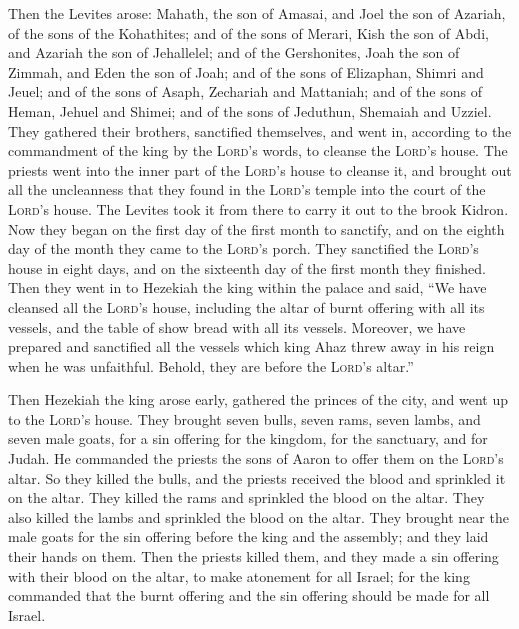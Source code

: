  Then the Levites arose: Mahath, the son of Amasai, and
Joel the son of Azariah, of the sons of the Kohathites; and of the sons
of Merari, Kish the son of Abdi, and Azariah the son of Jehallelel; and
of the Gershonites, Joah the son of Zimmah, and Eden the son of Joah;
 and of the sons of Elizaphan, Shimri and Jeuel; and of
the sons of Asaph, Zechariah and Mattaniah;  and of the
sons of Heman, Jehuel and Shimei; and of the sons of Jeduthun, Shemaiah
and Uzziel.  They gathered their brothers, sanctified
themselves, and went in, according to the commandment of the king by the
\textsc{Lord}'s words, to cleanse the \textsc{Lord}'s house.
 The priests went into the inner part of the
\textsc{Lord}'s house to cleanse it, and brought out all the uncleanness
that they found in the \textsc{Lord}'s temple into the court of the
\textsc{Lord}'s house. The Levites took it from there to carry it out to
the brook Kidron.  Now they began on the first day of the
first month to sanctify, and on the eighth day of the month they came to
the \textsc{Lord}'s porch. They sanctified the \textsc{Lord}'s house in
eight days, and on the sixteenth day of the first month they finished.
 Then they went in to Hezekiah the king within the palace
and said, ``We have cleansed all the \textsc{Lord}'s house, including
the altar of burnt offering with all its vessels, and the table of show
bread with all its vessels.  Moreover, we have prepared
and sanctified all the vessels which king Ahaz threw away in his reign
when he was unfaithful. Behold, they are before the \textsc{Lord}'s
altar.''

 Then Hezekiah the king arose early, gathered the princes
of the city, and went up to the \textsc{Lord}'s house. 
They brought seven bulls, seven rams, seven lambs, and seven male goats,
for a sin offering for the kingdom, for the sanctuary, and for Judah. He
commanded the priests the sons of Aaron to offer them on the
\textsc{Lord}'s altar.  So they killed the bulls, and the
priests received the blood and sprinkled it on the altar. They killed
the rams and sprinkled the blood on the altar. They also killed the
lambs and sprinkled the blood on the altar.  They brought
near the male goats for the sin offering before the king and the
assembly; and they laid their hands on them.  Then the
priests killed them, and they made a sin offering with their blood on
the altar, to make atonement for all Israel; for the king commanded that
the burnt offering and the sin offering should be made for all Israel.

